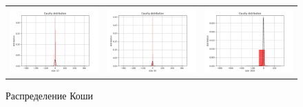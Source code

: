 \documentclass[../main.tex]{subfiles}
\begin{document}
	\begin{figure}[H]
		\centering
		\begin{tabular}{ccc}
			\includegraphics[width=55mm, height =0.25\textheight]{figures/CauchyNumber10.png} 
			&
			\includegraphics[width=55mm, height =0.25\textheight]{figures/CauchyNumber50.png}
			&
			\includegraphics[width=55mm, height =0.25\textheight]{figures/CauchyNumber1000.png}
		\end{tabular}
		\caption{Распределение Коши} 
		\label{fig:normal}
	\end{figure}
	
\end{document}
